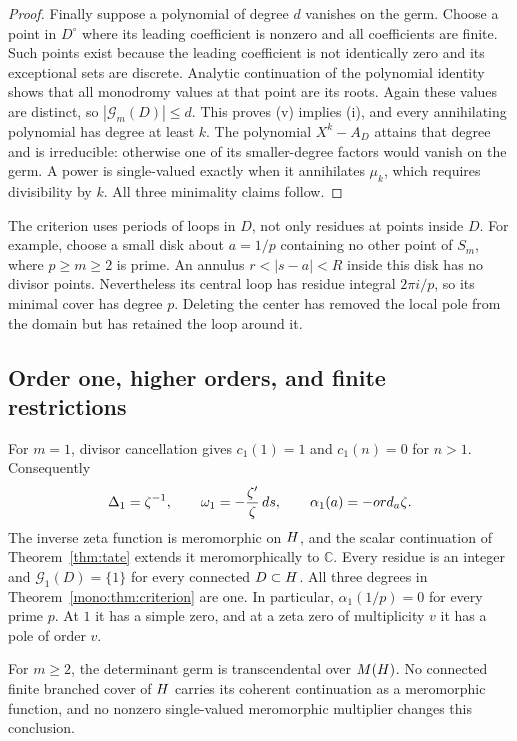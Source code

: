 \begin{proof}
Finally suppose a polynomial of degree \(d\) vanishes on the germ.
Choose a point in \(D^\circ\) where its leading coefficient is nonzero
and all coefficients are finite.  Such points exist because the leading
coefficient is not identically zero and its exceptional sets are discrete.
Analytic continuation of the polynomial identity shows that all monodromy
values at that point are its roots.
Again these values are distinct, so \(|\mathcal G_m(D)|\leq d\).
This proves (v) implies (i), and every annihilating polynomial has degree
at least \(k\).
The polynomial \(X^k-A_D\) attains that degree and is irreducible:
otherwise one of its smaller-degree factors would vanish on the germ.
A power is single-valued exactly when it annihilates \(\mu_k\), which
requires divisibility by \(k\).  All three minimality claims follow.
\end{proof}

The criterion uses periods of loops in \(D\), not only residues at
points inside \(D\).
For example, choose a small disk about \(a=1/p\) containing no other
point of \(S_m\), where \(p\geq m\geq2\) is prime.
An annulus \(r<|s-a|<R\) inside this disk has no divisor points.
Nevertheless its central loop has residue integral \(2\pi i/p\),
so its minimal cover has degree \(p\).
Deleting the center has removed the local pole from the domain but
has retained the loop around it.

\subsection{Order one, higher orders, and finite restrictions}

For \(m=1\), divisor cancellation gives
\(c_1(1)=1\) and \(c_1(n)=0\) for \(n>1\).
Consequently
\[
 \Delta_1=\zeta^{-1},\qquad
 \omega_1=-\frac{\zeta'}{\zeta}\,ds,\qquad
 \alpha_1(a)=-ord_a\zeta.
\]
The inverse zeta function is meromorphic on \(H\), and the
scalar continuation of Theorem~\ref{thm:tate} extends it meromorphically
to \(\mathbb C\).
Every residue is an integer and \(\mathcal G_1(D)=\{1\}\) for every connected
\(D\subset H\).  All three degrees in Theorem~\ref{mono:thm:criterion}
are one.  In particular, \(\alpha_1(1/p)=0\) for every prime \(p\).
At \(1\) it has a simple zero, and at a zeta zero of multiplicity \(v\)
it has a pole of order \(v\).

\begin{corollary}
\label{mono:thm:global}
For \(m\geq2\), the determinant germ is transcendental over
\(M(H)\).  No connected finite branched cover of \(H\)
carries its coherent continuation as a meromorphic function, and no
nonzero single-valued meromorphic multiplier changes this conclusion.
\end{corollary}

